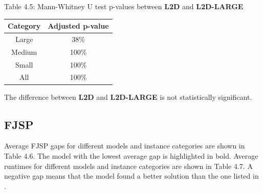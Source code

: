 \begin{table}
    Table 4.5: Mann-Whitney U test p-values between \textbf{L2D} and \textbf{L2D-LARGE}\\
    \begin{tabular}{cc}
        \toprule
        Category & Adjusted p-value \\
        \midrule
        Large & 38$\%$ \\
        Medium & 100$\%$ \\
        Small & 100$\%$ \\
        All & 100$\%$ \\
        \bottomrule
        \end{tabular}
\end{table}

The difference between \textbf{L2D} and \textbf{L2D-LARGE} is not statistically significant.

\subsection{FJSP} \label{results_fjsp}

Average FJSP gaps for different models and instance categories are shown in Table 4.6. The model with the lowest average gap is highlighted in bold. Average runtimes for different models and instance categories are shown in Table 4.7. A negative gap means that the model found a better solution than the one listed in \cite{fjsp_benchmarks}.

